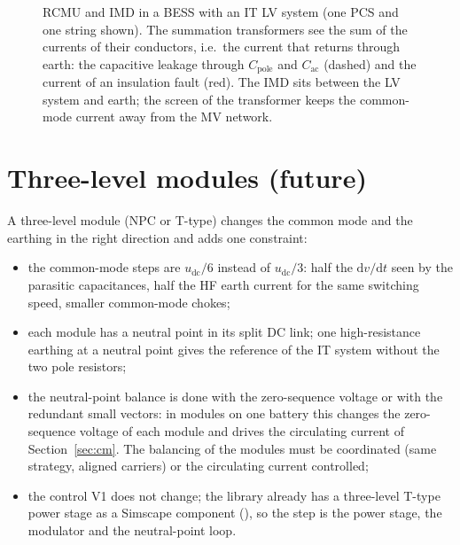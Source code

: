 \documentclass[11pt,a4paper]{scrartcl}
\newcommand{\ped}[1]{_{\mathrm{#1}}}
\newcommand{\dif}{\mathrm{d}}
\begin{document}
\begin{onehalfspace}
\begin{figure}[H]
	\captionsetup{width=0.92\textwidth, font=small}
	\caption[RCMU and IMD in a BESS with an IT LV system.]{RCMU and IMD in a BESS with an IT LV system (one PCS and one string shown). The summation transformers see the sum of the currents of their conductors, i.e.\ the current that returns through earth: the capacitive leakage through $C\ped{pole}$ and $C\ped{ac}$ (dashed) and the current of an insulation fault (red). The IMD sits between the LV system and earth; the screen of the transformer keeps the common-mode current away from the MV network.}
	\label{fig:rcmu}
\end{figure}

\section{Three-level modules (future)}
\label{sec:3l}

A three-level module (NPC or T-type) changes the common mode and the earthing in the right direction and adds one constraint:

\begin{itemize}[nosep]
	\item the common-mode steps are $u\ped{dc}/6$ instead of $u\ped{dc}/3$: half the $\dif v/\dif t$ seen by the parasitic capacitances, half the HF earth current for the same switching speed, smaller common-mode chokes;
	\item each module has a neutral point in its split DC link; one high-resistance earthing at a neutral point gives the reference of the IT system without the two pole resistors;
	\item the neutral-point balance is done with the zero-sequence voltage or with the redundant small vectors: in modules on one battery this changes the zero-sequence voltage of each module and drives the circulating current of Section~\ref{sec:cm}. The balancing of the modules must be coordinated (same strategy, aligned carriers) or the circulating current controlled;
	\item the control V1 does not change; the library already has a three-level T-type power stage as a Simscape component (), so the step is the power stage, the modulator and the neutral-point loop.
\end{itemize}


\end{onehalfspace}
\end{document}
